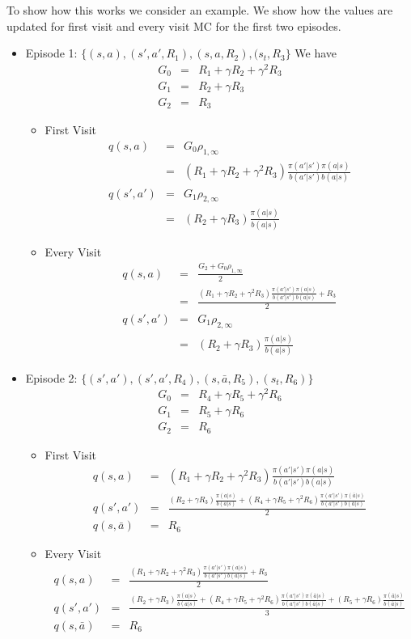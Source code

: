 \documentclass[11pt,a4paper]{article}
\newcommand\bea{\begin{eqnarray}}
\newcommand\eea{\end{eqnarray}}
\newcommand{\nn}{\nonumber \\}
\begin{document}
To show how this works we consider an example. We show how the values are updated for first visit and every visit MC for the first two episodes. 
\begin{itemize}
\item Episode 1: $\{(s,a),(s',a',R_1),(s,a,R_2),(s_t,R_3\}$ 
We have
\bea
G_0 &=& R_1 + \gamma R_2 + \gamma^2 R_3 \\
G_1 &=&  R_2 + \gamma R_3 \\
G_2 &=& R_3 
\eea

\begin{itemize}
\item First Visit
\bea
q(s,a) &=& G_0 \rho_{1,\infty} \nn
&=&  (R_1 + \gamma R_2+\gamma^2 R_3) \frac{\pi(a'|s') \pi(a|s)}{b(a'|s') b(a|s)} \\
q(s',a') &=& G_1 \rho_{2,\infty}  \nn
&=& (R_2 + \gamma R_3) \frac{\pi(a|s)}{b(a|s)}
\eea
\item Every Visit
\bea
q(s,a) &=& \frac{G_2 + G_0 \rho_{1,\infty}}{2} \nn
&=&  \frac{(R_1 + \gamma R_2+\gamma^2 R_3) \frac{\pi(a'|s') \pi(a|s)}{b(a'|s') b(a|s)}+R_3}{2} \\
q(s',a') &=& G_1 \rho_{2,\infty}  \nn
&=& (R_2 + \gamma R_3) \frac{\pi(a|s)}{b(a|s)}
\eea
\end{itemize}
\item  Episode 2: $\{(s',a'),(s',a',R_4),(s,\bar a,R_5),(s_t,R_6)\}$
\bea
G_0 &=& R_4 + \gamma R_5 + \gamma^2 R_6 \\
G_1 &=& R_5 + \gamma R_6 \\
G_2 &=& R_6
\eea
\begin{itemize}
\item First Visit
\bea
q(s,a) &=& (R_1 + \gamma R_2+\gamma^2 R_3) \frac{\pi(a'|s') \pi(a|s)}{b(a'|s') b(a|s)} \\
q(s',a') &=& \frac{(R_2 + \gamma R_3) \frac{\pi(a|s)}{b(a|s)} + (R_4 + \gamma R_5 + \gamma^2 R_6) \frac{\pi(a'|s') \pi(\bar a|s)}{b(a'|s') b(\bar a|s)}}{2} \\
q(s,\bar a) &=& R_6
\eea
\item Every Visit
\bea
q(s,a) &=& \frac{(R_1 + \gamma R_2+\gamma^2 R_3) \frac{\pi(a'|s') \pi(a|s)}{b(a'|s') b(a|s)}+R_3}{2} \\
q(s',a') &=& \frac{(R_2 + \gamma R_3) \frac{\pi(a|s)}{b(a|s)} + (R_4 + \gamma R_5 + \gamma^2 R_6) \frac{\pi(a'|s') \pi(\bar a|s)}{b(a'|s') b(\bar a|s)} + (R_5+ \gamma R_6)  \frac{ \pi(\bar a|s)}{ b(\bar a|s)}}{3} \\
q(s,\bar a) &=& R_6
\eea
\end{itemize}
\end{itemize}
\end{document}
